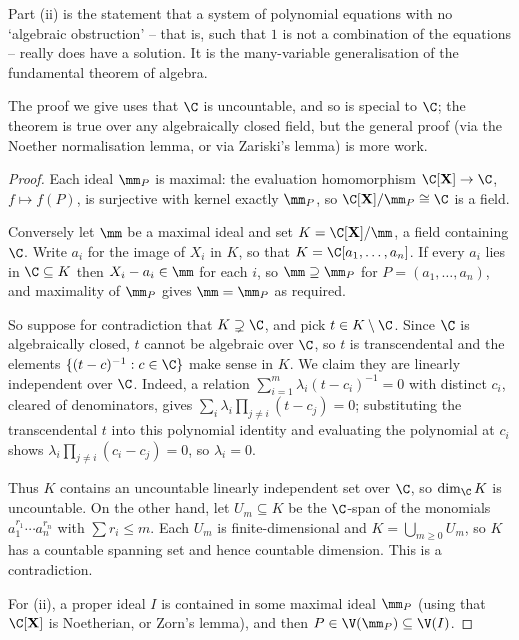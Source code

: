 Part (ii) is the statement that a system of polynomial equations with no `algebraic obstruction' -- that is, such that $1$ is not a combination of the equations -- really does have a solution. It is the many-variable generalisation of the fundamental theorem of algebra.

The proof we give uses that $\C$ is uncountable, and so is special to $\C$; the theorem is true over any algebraically closed field, but the general proof (via the Noether normalisation lemma, or via Zariski's lemma) is more work.

\begin{proof}
	Each ideal $\mm_P$ is maximal: the evaluation homomorphism $\C[\mathbf{X}] \to \C$, $f \mapsto f(P)$, is surjective with kernel exactly $\mm_P$, so $\C[\mathbf{X}]/\mm_P \cong \C$ is a field.

	Conversely let $\mm$ be a maximal ideal and set $K = \C[\mathbf{X}]/\mm$, a field containing $\C$. Write $a_i$ for the image of $X_i$ in $K$, so that $K = \C[a_1,\dots,a_n]$. If every $a_i$ lies in $\C \subseteq K$ then $X_i - a_i \in \mm$ for each $i$, so $\mm \supseteq \mm_P$ for $P = (a_1,\dots,a_n)$, and maximality of $\mm_P$ gives $\mm = \mm_P$ as required.

	So suppose for contradiction that $K \supsetneq \C$, and pick $t \in K \setminus \C$. Since $\C$ is algebraically closed, $t$ cannot be algebraic over $\C$, so $t$ is transcendental and the elements $\{(t-c)^{-1} : c \in \C\}$ make sense in $K$. We claim they are linearly independent over $\C$. Indeed, a relation $\sum_{i=1}^m \lambda_i (t-c_i)^{-1} = 0$ with distinct $c_i$, cleared of denominators, gives $\sum_i \lambda_i \prod_{j\neq i}(t - c_j) = 0$; substituting the transcendental $t$ into this polynomial identity and evaluating the polynomial at $c_i$ shows $\lambda_i \prod_{j \neq i}(c_i - c_j) = 0$, so $\lambda_i = 0$.

	Thus $K$ contains an uncountable linearly independent set over $\C$, so $\dim_\C K$ is uncountable. On the other hand, let $U_m \subseteq K$ be the $\C$-span of the monomials $a_1^{r_1}\cdots a_n^{r_n}$ with $\sum r_i \leq m$. Each $U_m$ is finite-dimensional and $K = \bigcup_{m \geq 0} U_m$, so $K$ has a countable spanning set and hence countable dimension. This is a contradiction.

	For (ii), a proper ideal $I$ is contained in some maximal ideal $\mm_P$ (using that $\C[\mathbf{X}]$ is Noetherian, or Zorn's lemma), and then $P \in \V(\mm_P) \subseteq \V(I)$.
\end{proof}


